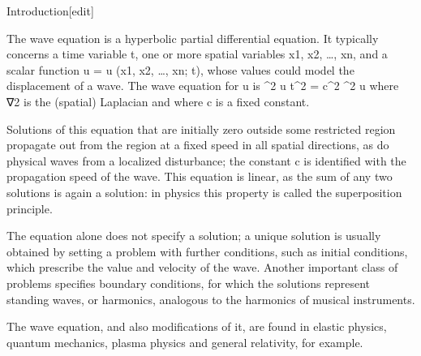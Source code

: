 Introduction[edit]

The wave equation is a hyperbolic partial differential equation. It typically concerns a time variable t, one or more spatial variables x1, x2, …, xn, and a scalar function u = u (x1, x2, …, xn; t), whose values could model the displacement of a wave. The wave equation for u is
{ \partial^2 u \over \partial t^2 } = c^2 \nabla^2 u 
where ∇2 is the (spatial) Laplacian and where c is a fixed constant.

Solutions of this equation that are initially zero outside some restricted region propagate out from the region at a fixed speed in all spatial directions, as do physical waves from a localized disturbance; the constant c is identified with the propagation speed of the wave. This equation is linear, as the sum of any two solutions is again a solution: in physics this property is called the superposition principle.

The equation alone does not specify a solution; a unique solution is usually obtained by setting a problem with further conditions, such as initial conditions, which prescribe the value and velocity of the wave. Another important class of problems specifies boundary conditions, for which the solutions represent standing waves, or harmonics, analogous to the harmonics of musical instruments.

The wave equation, and also modifications of it, are found in elastic physics, quantum mechanics, plasma physics and general relativity, for example.
